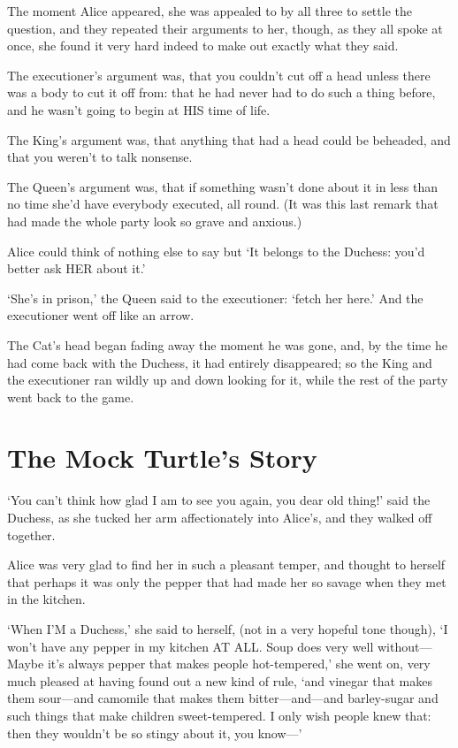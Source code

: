 \documentclass[12pt]{book}
\begin{document}
\begin{Parallel}[p]{}{}
{The moment Alice appeared, she was appealed to by all three to settle the question, and they repeated their arguments to her, though, as they all spoke at once, she found it very hard indeed to make out exactly what they said.

The executioner’s argument was, that you couldn’t cut off a head unless there was a body to cut it off from: that he had never had to do such a thing before, and he wasn’t going to begin at HIS time of life.

The King’s argument was, that anything that had a head could be beheaded, and that you weren’t to talk nonsense.

The Queen’s argument was, that if something wasn’t done about it in less than no time she’d have everybody executed, all round. (It was this last remark that had made the whole party look so grave and anxious.)

Alice could think of nothing else to say but ‘It belongs to the Duchess: you’d better ask HER about it.’

‘She’s in prison,’ the Queen said to the executioner: ‘fetch her here.’ And the executioner went off like an arrow.

 The Cat’s head began fading away the moment he was gone, and, by the time he had come back with the Duchess, it had entirely disappeared; so the King and the executioner ran wildly up and down looking for it, while the rest of the party went back to the game.




\section{The Mock Turtle’s Story}

‘You can’t think how glad I am to see you again, you dear old thing!’ said the Duchess, as she tucked her arm affectionately into Alice’s, and they walked off together.

Alice was very glad to find her in such a pleasant temper, and thought to herself that perhaps it was only the pepper that had made her so savage when they met in the kitchen.

‘When I’M a Duchess,’ she said to herself, (not in a very hopeful tone though), ‘I won’t have any pepper in my kitchen AT ALL. Soup does very well without—Maybe it’s always pepper that makes people hot-tempered,’ she went on, very much pleased at having found out a new kind of rule, ‘and vinegar that makes them sour—and camomile that makes them bitter—and—and barley-sugar and such things that make children sweet-tempered. I only wish people knew that: then they wouldn’t be so stingy about it, you know—’

}
\end{Parallel}
\end{document}
